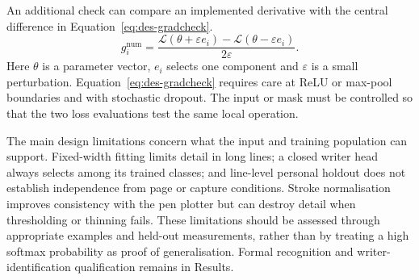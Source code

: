An additional check can compare an implemented derivative with the central difference in Equation~\ref{eq:des-gradcheck}.
\begin{equation}
g_i^{\mathrm{num}}=\frac{\mathcal L(\theta+\varepsilon e_i)
-\mathcal L(\theta-\varepsilon e_i)}{2\varepsilon}.
\label{eq:des-gradcheck}
\end{equation}
Here $\theta$ is a parameter vector, $e_i$ selects one component and $\varepsilon$ is a small perturbation. Equation~\ref{eq:des-gradcheck} requires care at ReLU or max-pool boundaries and with stochastic dropout. The input or mask must be controlled so that the two loss evaluations test the same local operation.

The main design limitations concern what the input and training population can support. Fixed-width fitting limits detail in long lines; a closed writer head always selects among its trained classes; and line-level personal holdout does not establish independence from page or capture conditions. Stroke normalisation improves consistency with the pen plotter but can destroy detail when thresholding or thinning fails. These limitations should be assessed through appropriate examples and held-out measurements, rather than by treating a high softmax probability as proof of generalisation. Formal recognition and writer-identification qualification remains in Results.
\FloatBarrier
